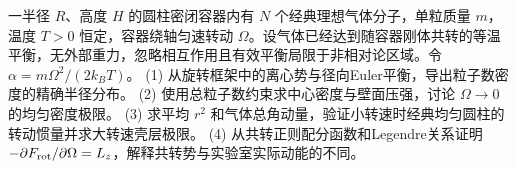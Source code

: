一半径 \(R\)、高度 \(H\) 的圆柱密闭容器内有 \(N\) 个经典理想气体分子，单粒质量 \(m\)，温度 \(T>0\) 恒定，容器绕轴匀速转动 \(\Omega\)。设气体已经达到随容器刚体共转的等温平衡，无外部重力，忽略相互作用且有效平衡局限于非相对论区域。令 \(\alpha=m\Omega^2/(2k_BT)\)。
(1) 从旋转框架中的离心势与径向Euler平衡，导出粒子数密度的精确半径分布。
(2) 使用总粒子数约束求中心密度与壁面压强，讨论 \(\Omega\to0\) 的均匀密度极限。
(3) 求平均 \(r^2\) 和气体总角动量，验证小转速时经典均匀圆柱的转动惯量并求大转速壳层极限。
(4) 从共转正则配分函数和Legendre关系证明 \(-\partial F_{\rm rot}/\partial\Omega=L_z\)，解释共转势与实验室实际动能的不同。
